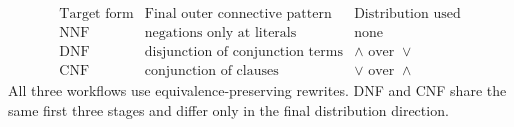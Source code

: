 \begin{remark*}[Comparison]
\[
\begin{array}{c|c|c}
\text{Target form} & \text{Final outer connective pattern} & \text{Distribution used}\\
\hline
\text{NNF} & \text{negations only at literals} & \text{none}\\
\text{DNF} & \text{disjunction of conjunction terms} &
\land\text{ over }\lor\\
\text{CNF} & \text{conjunction of clauses} &
\lor\text{ over }\land
\end{array}
\]
All three workflows use equivalence-preserving rewrites. DNF and CNF share the
same first three stages and differ only in the final distribution direction.
\end{remark*}
